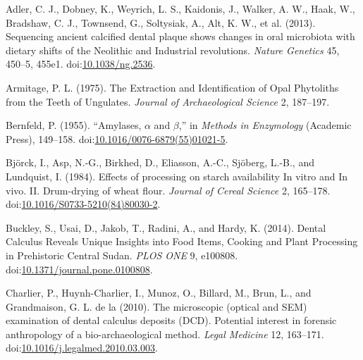 \documentclass[utf8]{frontiers/frontiersSCNS}
\newlength{\cslhangindent}
\newlength{\cslentryspacingunit} %
\newenvironment{CSLReferences}[2] %
 {%
  \setlength{\parindent}{0pt}
  \ifodd #1
  \let\oldpar\par
  \def\par{\hangindent=\cslhangindent\oldpar}
  \fi
  \setlength{\parskip}{#2\cslentryspacingunit}
 }%
 {}
\begin{document}
\hypertarget{refs}{}
\begin{CSLReferences}{1}{0}
\leavevmode{}%
Adler, C. J., Dobney, K., Weyrich, L. S., Kaidonis, J., Walker, A. W., Haak, W., Bradshaw, C. J., Townsend, G., Soltysiak, A., Alt, K. W., et al. (2013). Sequencing ancient calcified dental plaque shows changes in oral microbiota with dietary shifts of the {Neolithic} and {Industrial} revolutions. \emph{Nature Genetics} 45, 450--5, 455e1. doi:\href{https://doi.org/10.1038/ng.2536}{10.1038/ng.2536}.

\leavevmode{}%
Armitage, P. L. (1975). The {Extraction} and {Identification} of {Opal Phytoliths} from the {Teeth} of {Ungulates}. \emph{Journal of Archaeological Science} 2, 187--197.

\leavevmode{}%
Bernfeld, P. (1955). {``Amylases, {\(\alpha\)} and {\(\beta\)},''} in \emph{Methods in {Enzymology}} ({Academic Press}), 149--158. doi:\href{https://doi.org/10.1016/0076-6879(55)01021-5}{10.1016/0076-6879(55)01021-5}.

\leavevmode{}%
Björck, I., Asp, N.-G., Birkhed, D., Eliasson, A.-C., Sjöberg, L.-B., and Lundquist, I. (1984). Effects of processing on starch availability {In} vitro and {In} vivo. {II}. {Drum-drying} of wheat flour. \emph{Journal of Cereal Science} 2, 165--178. doi:\href{https://doi.org/10.1016/S0733-5210(84)80030-2}{10.1016/S0733-5210(84)80030-2}.

\leavevmode{}%
Buckley, S., Usai, D., Jakob, T., Radini, A., and Hardy, K. (2014). Dental {Calculus Reveals Unique Insights} into {Food Items}, {Cooking} and {Plant Processing} in {Prehistoric Central Sudan}. \emph{PLOS ONE} 9, e100808. doi:\href{https://doi.org/10.1371/journal.pone.0100808}{10.1371/journal.pone.0100808}.

\leavevmode{}%
Charlier, P., Huynh-Charlier, I., Munoz, O., Billard, M., Brun, L., and Grandmaison, G. L. de la (2010). The microscopic (optical and {SEM}) examination of dental calculus deposits ({DCD}). {Potential} interest in forensic anthropology of a bio-archaeological method. \emph{Legal Medicine} 12, 163--171. doi:\href{https://doi.org/10.1016/j.legalmed.2010.03.003}{10.1016/j.legalmed.2010.03.003}.


\end{CSLReferences}
\end{document}
